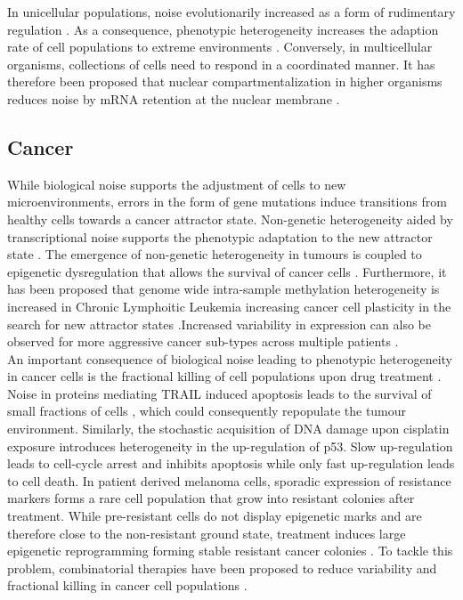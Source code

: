 In unicellular populations, noise evolutionarily increased as a form of rudimentary regulation \citep{Wolf2015}. As a consequence, phenotypic heterogeneity increases the adaption rate of cell populations to extreme environments \cite{Bodi2017}. Conversely, in multicellular organisms, collections of cells need to respond in a coordinated manner. It has therefore been proposed that nuclear compartmentalization in higher organisms reduces noise by mRNA retention at the nuclear membrane \citep{Battich2013, Stoeger2016}.

\subsection{Cancer}

While biological noise supports the adjustment of cells to new microenvironments, errors in the form of gene mutations induce transitions from healthy cells towards a cancer attractor state\citep{Marusyk2012}. Non-genetic heterogeneity aided by transcriptional noise supports the phenotypic adaptation to the new attractor state \citep{Jia2017}. The emergence of non-genetic heterogeneity in tumours is coupled to epigenetic dysregulation that allows the survival of cancer cells \citep{Timp2013}. Furthermore, it has been proposed that genome wide intra-sample methylation heterogeneity is increased in Chronic Lymphoitic Leukemia increasing cancer cell plasticity in the search for new attractor states \citep{Landau2014}.Increased variability in expression can also be observed for more aggressive cancer sub-types across multiple patients \citep{Ecker2015}. \\

An important consequence of biological noise leading to phenotypic heterogeneity in cancer cells is the fractional killing of cell populations upon drug treatment \citep{Flusberg2015}. Noise in proteins mediating \Gls{TRAIL} induced apoptosis leads to the survival of small fractions of cells \citep{Spencer2009}, which could consequently repopulate the tumour environment. Similarly, the stochastic acquisition of DNA damage upon cisplatin exposure introduces heterogeneity in the up-regulation of p53. Slow up-regulation leads to cell-cycle arrest and inhibits apoptosis while only fast up-regulation leads to cell death. In patient derived melanoma cells, sporadic expression of resistance markers forms a rare cell population that grow into resistant colonies after treatment. While pre-resistant cells do not display epigenetic marks and are therefore close to the non-resistant ground state, treatment induces large epigenetic reprogramming forming stable resistant cancer colonies \citep{Shaffer2017}. To tackle this problem, combinatorial therapies have been proposed to reduce variability and fractional killing in cancer cell populations \cite{Paek2016, Roux2015}.\\

